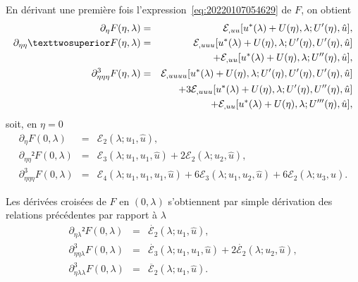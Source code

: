 \documentclass[12pt, final]{amsart}
\begin{document}
En dérivant une première fois l'expression~\eqref{eq:20220107054629} de \(F\),
on obtient
\begin{eqnarray}
  \partial _\eta F(\eta , \lambda )
  &=&\mathcal E_{,uu}[u^*(\lambda )+U(\eta ), \lambda ; U'(\eta ), \hat{u}],\\
  \notag
  \partial _{\eta \eta }²F(\eta , \lambda )
  &=&\mathcal E_{,uuu}[u^*(\lambda )+U(\eta ), \lambda ; U'(\eta ), U'(\eta ), \hat{u}]\\
  &&+\mathcal E_{,uu}[u^*(\lambda )+U(\eta ), \lambda ; U''(\eta ), \hat{u}],\\
  \notag
  \partial _{\eta \eta \eta }^3F(\eta , \lambda )
  &=&\mathcal E_{,uuuu}[u^*(\lambda )+U(\eta ), \lambda ;U'(\eta ), U'(\eta ), U'(\eta ), \hat{u}]\\
  \notag
  &&+3\mathcal E_{,uuu}[u^*(\lambda )+U(\eta ), \lambda ;U'(\eta ), U''(\eta ), \hat{u}]\\
  &&+\mathcal E_{,uu}[u^*(\lambda )+U(\eta ), \lambda ;U'''(\eta ), \hat{u}],
\end{eqnarray}
soit, en \(\eta =0\)
\begin{eqnarray}
  \partial _\eta  F(0, \lambda )
  &=&\mathcal E_2(\lambda ; u_1, \hat{u}),\\
  \partial _{\eta \eta }²F(0, \lambda )
  &=&\mathcal E_3(\lambda ; u_1, u_1, \hat{u})+2\mathcal E_2(\lambda ; u_2, \hat{u}),\\
  \partial _{\eta \eta \eta }^3F(0, \lambda )
  &=&\mathcal E_4(\lambda ; u_1, u_1, u_1, \hat{u})+6\mathcal E_3(\lambda ; u_1, u_2, \hat{u})+6\mathcal E_2(\lambda ; u_3, \hat{u}).
\end{eqnarray}

Les dérivées croisées de \(F\) en \((0, \lambda )\) s'obtiennent par simple dérivation
des relations précédentes par rapport à \(\lambda \)
\begin{eqnarray}
  \partial _{\eta \lambda }²F(0, \lambda )&=&\dot{\mathcal E_2}(\lambda ; u_1, \hat{u}),\\
  \partial _{\eta \eta \lambda }^3F(0, \lambda )&=&\dot{\mathcal E_3}(\lambda ; u_1, u_1, \hat{u})+2\dot{\mathcal E_2}(\lambda ; u_2, \hat{u}),\\
  \partial _{\eta \lambda \lambda }^3F(0, \lambda )&=&\ddot{\mathcal E_2}(\lambda ; u_1, \hat{u}).
\end{eqnarray}
\end{document}
